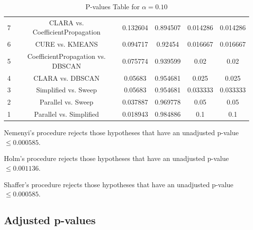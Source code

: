 \documentclass[a4paper,10pt]{article}
\begin{document}
\begin{landscape}
\begin{table}[!htp]
\begin{tabular}{cccccc}
7&CLARA vs. CoefficientPropagation&0.132604&0.894507&0.014286&0.014286\\
6&CURE vs. KMEANS&0.094717&0.92454&0.016667&0.016667\\
5&CoefficientPropagation vs. DBSCAN&0.075774&0.939599&0.02&0.02\\
4&CLARA vs. DBSCAN&0.05683&0.954681&0.025&0.025\\
3&Simplified vs. Sweep&0.05683&0.954681&0.033333&0.033333\\
2&Parallel vs. Sweep&0.037887&0.969778&0.05&0.05\\
1&Parallel vs. Simplified&0.018943&0.984886&0.1&0.1\\
\hline
\end{tabular}
\caption{P-values Table for $\alpha=0.10$}
\end{table}Nemenyi's procedure rejects those hypotheses that have an unadjusted p-value $\le0.000585$.

Holm's procedure rejects those hypotheses that have an unadjusted p-value $\le0.001136$.

Shaffer's procedure rejects those hypotheses that have an unadjusted p-value $\le0.000585$.

\pagebreak

\subsection{Adjusted p-values}


\end{landscape}
\end{document}
